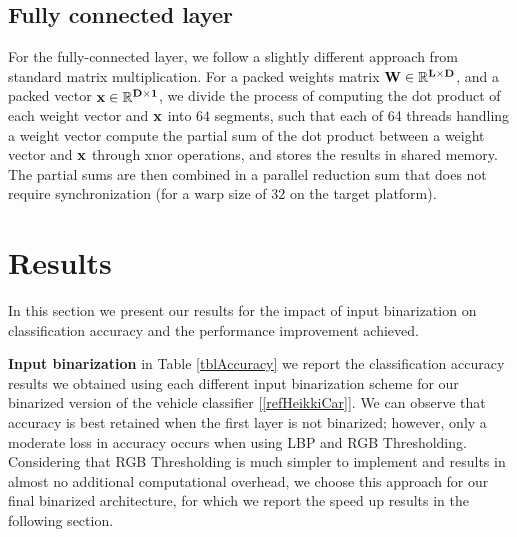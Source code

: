 \documentclass[conference,compsoc]{IEEEtran}
\newcommand{\jani}[1]{\textcolor{red}{\textbf{[Jani: #1]}}}
\begin{document}
\subsection{Fully connected layer}
For the fully-connected layer, we follow a slightly different approach from standard matrix multiplication. For a packed weights matrix $\bf{W}\in \mathbb{R}^{L\times D}$, and a packed vector $\bf{x}\in \mathbb{R}^{D\times 1}$, we divide the process of computing the dot product of each weight vector and $\bf{x}$ into $64$ segments, such that each of 64 threads handling a weight vector compute the partial sum of the dot product between a weight vector and $\bf{x}$ through xnor operations, and stores the results in shared memory. The partial sums are then combined in a parallel reduction sum that does not require synchronization (for a warp size of 32 on the target platform).
\section{Results}

 In this section we present our results for the impact of input binarization on classification accuracy and the performance improvement achieved.


\textbf{Input binarization}
in Table \ref{tblAccuracy} we report the classification accuracy results we obtained using each different input binarization scheme for our binarized version of the vehicle classifier [\ref{refHeikkiCar}]. We can observe that accuracy is best retained when the first layer is not binarized; however, only a moderate loss in accuracy occurs when using LBP and RGB Thresholding. Considering that RGB Thresholding is much simpler to implement and results in almost no additional computational overhead, we choose this approach for our final binarized architecture, for which we report the speed up results in the following section.
\end{document}

